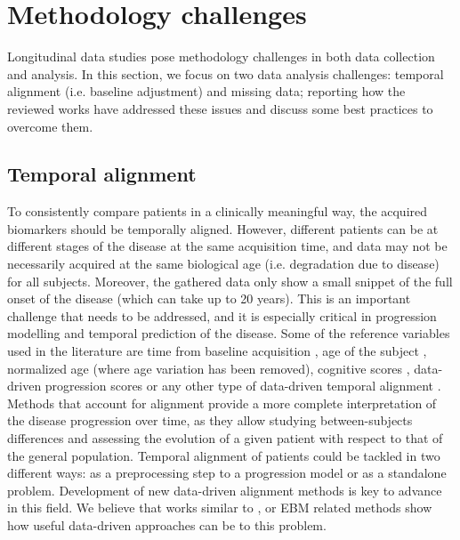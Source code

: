 \section{Methodology challenges}
\label{sec:missing}

Longitudinal data studies pose methodology challenges in both data collection and analysis. In this section, we focus on two data analysis challenges: temporal alignment (i.e. baseline adjustment) and missing data; reporting how the reviewed works have addressed these issues and discuss some best practices to overcome them.

\subsection{Temporal alignment}
\label{subsec:tempalig}

To consistently compare patients in a clinically meaningful way, the acquired biomarkers should be temporally aligned. However, different patients can be at different stages of the disease at the same acquisition time, and data may not be necessarily acquired at the same biological age (i.e. degradation due to disease) for all subjects. Moreover, the gathered data only show a small snippet of the full onset of the disease (which can take up to 20 years). This is an important challenge that needs to be addressed, and it is especially critical in progression modelling and temporal prediction of the disease. Some of the reference variables used in the literature are time from baseline acquisition \cite{Donohue14,Franke2012}, age of the subject \cite{Bateman2012}, normalized age \cite{Lorenzi2014} (where age variation has been removed), cognitive scores \cite{Guerrero2016,Yang2011}, data-driven progression scores \cite{Casanova2018,Clark2012,Davatzikos2009,Jedynak2012,Schmidt-Richberg2015} or any other type of data-driven temporal alignment \cite{Goyal2018}. \\

Methods that account for alignment provide a more complete interpretation of the disease progression over time, as they allow studying between-subjects differences and assessing the evolution of a given patient with respect to that of the general population. Temporal alignment of patients could be tackled in two different ways: as a preprocessing step to a progression model or as a standalone problem. Development of new data-driven alignment methods is key to advance in this field. We believe that works similar to \cite{Bone2018,Goyal2018}, or EBM related methods \cite{Fonteijn2012,Huang2012,Young2014} show how useful data-driven approaches can be to this problem. \\


